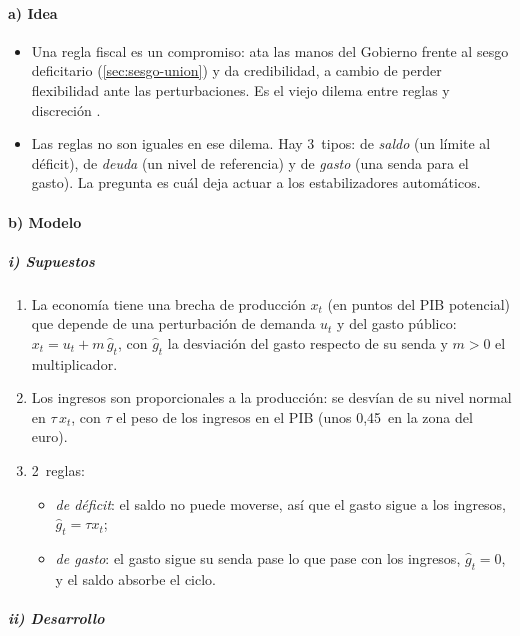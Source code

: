 \documentclass[11pt]{article}
\begin{document}
\paragraph{a) Idea}

\begin{itemize}
\item Una regla fiscal es un compromiso: ata las manos del Gobierno frente al sesgo deficitario (\ref{sec:sesgo-union}) y da credibilidad, a cambio de perder flexibilidad ante las perturbaciones. Es el viejo dilema entre reglas y discreción .
\item Las reglas no son iguales en ese dilema. Hay 3~tipos: de \emph{saldo} (un límite al déficit), de \emph{deuda} (un nivel de referencia) y de \emph{gasto} (una senda para el gasto). La pregunta es cuál deja actuar a los estabilizadores automáticos.
\end{itemize}

\paragraph{b) Modelo}

\subparagraph{i) Supuestos}

\begin{enumerate}
\item La economía tiene una brecha de producción $x_t$ (en puntos del PIB potencial) que depende de una perturbación de demanda $u_t$ y del gasto público: $x_t=u_t+m\,\hat g_t$, con $\hat g_t$ la desviación del gasto respecto de su senda y $m>0$ el multiplicador.
\item Los ingresos son proporcionales a la producción: se desvían de su nivel normal en $\tau\,x_t$, con $\tau$ el peso de los ingresos en el PIB (unos 0,45~en la zona del euro).
\item 2~reglas:
  \begin{itemize}
  \item \emph{de déficit}: el saldo no puede moverse, así que el gasto sigue a los ingresos, $\hat g_t=\tau x_t$;
  \item \emph{de gasto}: el gasto sigue su senda pase lo que pase con los ingresos, $\hat g_t=0$, y el saldo absorbe el ciclo.
  \end{itemize}
\end{enumerate}

\subparagraph{ii) Desarrollo}
\end{document}
